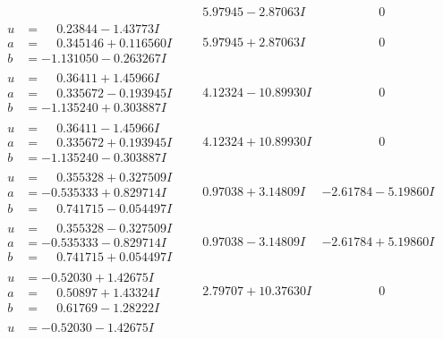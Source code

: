 \documentclass[1p]{elsarticle_modified}
\theoremstyle{definition}
\begin{document}
$$\begin{array}{c|c|c}
 & \phantom{-}5.97945 - 2.87063 I & \phantom{-0.000000 } 0 \\ \hline\begin{aligned}
u &= \phantom{-}0.23844 - 1.43773 I \\
a &= \phantom{-}0.345146 + 0.116560 I \\
b &= -1.131050 - 0.263267 I\end{aligned}
 & \phantom{-}5.97945 + 2.87063 I & \phantom{-0.000000 } 0 \\ \hline\begin{aligned}
u &= \phantom{-}0.36411 + 1.45966 I \\
a &= \phantom{-}0.335672 - 0.193945 I \\
b &= -1.135240 + 0.303887 I\end{aligned}
 & \phantom{-}4.12324 - 10.89930 I & \phantom{-0.000000 } 0 \\ \hline\begin{aligned}
u &= \phantom{-}0.36411 - 1.45966 I \\
a &= \phantom{-}0.335672 + 0.193945 I \\
b &= -1.135240 - 0.303887 I\end{aligned}
 & \phantom{-}4.12324 + 10.89930 I & \phantom{-0.000000 } 0 \\ \hline\begin{aligned}
u &= \phantom{-}0.355328 + 0.327509 I \\
a &= -0.535333 + 0.829714 I \\
b &= \phantom{-}0.741715 - 0.054497 I\end{aligned}
 & \phantom{-}0.97038 + 3.14809 I & -2.61784 - 5.19860 I \\ \hline\begin{aligned}
u &= \phantom{-}0.355328 - 0.327509 I \\
a &= -0.535333 - 0.829714 I \\
b &= \phantom{-}0.741715 + 0.054497 I\end{aligned}
 & \phantom{-}0.97038 - 3.14809 I & -2.61784 + 5.19860 I \\ \hline\begin{aligned}
u &= -0.52030 + 1.42675 I \\
a &= \phantom{-}0.50897 + 1.43324 I \\
b &= \phantom{-}0.61769 - 1.28222 I\end{aligned}
 & \phantom{-}2.79707 + 10.37630 I & \phantom{-0.000000 } 0 \\ \hline\begin{aligned}
u &= -0.52030 - 1.42675 I \\

\end{aligned}
\end{array}$$
\end{document}
